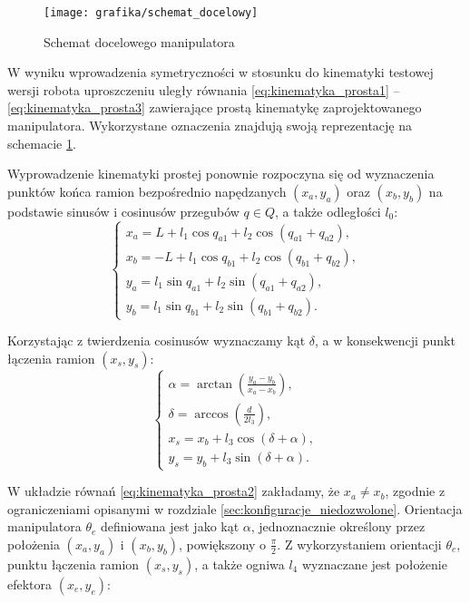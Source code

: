 \documentclass[printmode]{mgr}
\begin{document}
\begin{figure}[tp]
\centering
  \texttt{[image: grafika/schemat\_docelowy]}
  \caption{Schemat docelowego manipulatora}
  \label{rys:schemat_docelowy}  
\end{figure}

W wyniku wprowadzenia symetryczności w stosunku do kinematyki testowej wersji robota
uproszczeniu uległy równania \ref{eq:kinematyka_prosta1} -- \ref{eq:kinematyka_prosta3} 
zawierające prostą kinematykę zaprojektowanego manipulatora.
Wykorzystane oznaczenia znajdują swoją reprezentację na schemacie \ref{rys:schemat_docelowy}.

Wyprowadzenie kinematyki prostej ponownie rozpoczyna się od wyznaczenia punktów końca ramion bezpośrednio napędzanych 
$(x_a, y_a)$ oraz $(x_b, y_b)$ na podstawie
sinusów i cosinusów przegubów $q \in Q$, a także odległości $l_0$:
\begin{equation}
\begin{cases}
x_a = L + l_1\cos q_{a1} + l_2 \cos(q_{a1}+q_{a2}),\\
x_b = -L + l_1\cos q_{b1} + l_2 \cos(q_{b1}+q_{b2}),\\
y_a = l_1\sin q_{a1} + l_2 \sin(q_{a1}+q_{a2}),\\
y_b = l_1\sin q_{b1} + l_2 \sin(q_{b1}+q_{b2}).
\end{cases}
\label{eq:kinematyka_prosta1}
\end{equation}

Korzystając z twierdzenia cosinusów wyznaczamy kąt $\delta$, a w konsekwencji punkt łączenia ramion $(x_s, y_s)$:
\begin{equation}
\begin{cases}
\alpha = \arctan(\frac{y_a-y_b}{x_a-x_b}),\\
\delta = \arccos(\frac{d}{2l_3}),\\
x_s = x_b + l_3\cos(\delta + \alpha),\\
y_s = y_b + l_3\sin(\delta + \alpha).
\end{cases}
\label{eq:kinematyka_prosta2}
\end{equation}

W układzie równań \ref{eq:kinematyka_prosta2} zakładamy, że $x_a \neq x_b$, zgodnie z ograniczeniami opisanymi 
w rozdziale \ref{sec:konfiguracje_niedozwolone}.
Orientacja manipulatora $\theta_e$ definiowana jest jako kąt $\alpha$, jednoznacznie określony przez położenia $(x_a, y_a)$ i $(x_b, y_b)$,
powiększony o $\frac{\pi}{2}$. Z wykorzystaniem orientacji $\theta_e$, punktu łączenia ramion $(x_s, y_s)$, 
a także ogniwa $l_4$ wyznaczane jest położenie efektora $(x_e, y_e)$:
\end{document}
